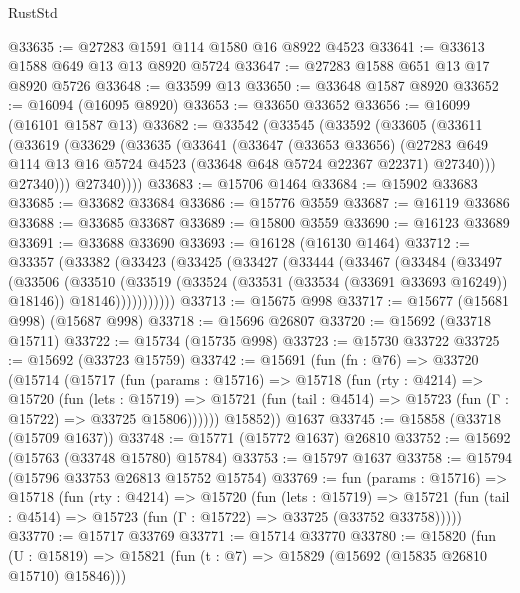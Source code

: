 \begin{lexlean}{RustStd}
\begin{coremodule}
@33635 := @27283 @1591 @114 @1580 @16 @8922 @4523
@33641 := @33613 @1588 @649 @13 @13 @8920 @5724
@33647 := @27283 @1588 @651 @13 @17 @8920 @5726
@33648 := @33599 @13
@33650 := @33648 @1587 @8920
@33652 := @16094 (@16095 @8920)
@33653 := @33650 @33652
@33656 := @16099 (@16101 @1587 @13)
@33682 := @33542
    (@33545
      (@33592
        (@33605
          (@33611
            (@33619
              (@33629
                (@33635
                  (@33641
                    (@33647
                      (@33653 @33656)
                      (@27283
                        @649
                        @114
                        @13
                        @16
                        @5724
                        @4523
                        (@33648 @648 @5724 @22367 @22371)
                        @27340)))
                  @27340)))
            @27340))))
@33683 := @15706 @1464
@33684 := @15902 @33683
@33685 := @33682 @33684
@33686 := @15776 @3559
@33687 := @16119 @33686
@33688 := @33685 @33687
@33689 := @15800 @3559
@33690 := @16123 @33689
@33691 := @33688 @33690
@33693 := @16128 (@16130 @1464)
@33712 := @33357
    (@33382
      (@33423
        (@33425
          (@33427
            (@33444
              (@33467
                (@33484
                  (@33497
                    (@33506
                      (@33510
                        (@33519
                          (@33524 (@33531 (@33534 (@33691 @33693 @16249)) @18146))
                          @18146)))))))))))
@33713 := @15675 @998
@33717 := @15677 (@15681 @998) (@15687 @998)
@33718 := @15696 @26807
@33720 := @15692 (@33718 @15711)
@33722 := @15734 (@15735 @998)
@33723 := @15730 @33722
@33725 := @15692 (@33723 @15759)
@33742 := @15691
    (fun (fn : @76) =>
    @33720
      (@15714
        (@15717
          (fun (params : @15716) =>
          @15718
            (fun (rty : @4214) =>
            @15720
              (fun (lets : @15719) =>
              @15721 (fun (tail : @4514) => @15723 (fun (Γ : @15722) => @33725 @15806))))))
        @15852))
    @1637
@33745 := @15858 (@33718 (@15709 @1637))
@33748 := @15771 (@15772 @1637) @26810
@33752 := @15692 (@15763 (@33748 @15780) @15784)
@33753 := @15797 @1637
@33758 := @15794 (@15796 @33753 @26813 @15752 @15754)
@33769 := fun (params : @15716) =>
  @15718
    (fun (rty : @4214) =>
    @15720
      (fun (lets : @15719) =>
      @15721 (fun (tail : @4514) => @15723 (fun (Γ : @15722) => @33725 (@33752 @33758)))))
@33770 := @15717 @33769
@33771 := @15714 @33770
@33780 := @15820
    (fun (U : @15819) => @15821 (fun (t : @7) => @15829 (@15692 (@15835 @26810 @15710) @15846)))

\end{coremodule}
\end{lexlean}

